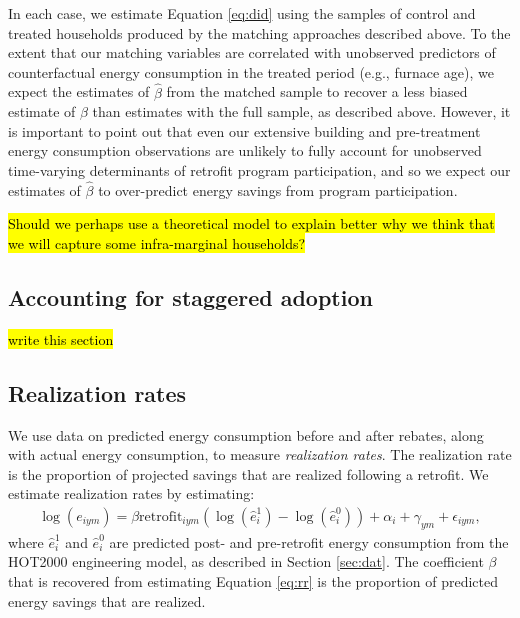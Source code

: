 \documentclass{article}
\newcommand{\hlc}[2][yellow]{ {\sethlcolor{#1} \hl{#2}} }
\begin{document}
In each case, we estimate Equation \eqref{eq:did} using the samples of control and treated households produced by the matching approaches described above. To the extent that our matching variables are correlated with unobserved predictors of counterfactual energy consumption in the treated period (e.g., furnace age), we expect the estimates of $\hat{\beta}$ from the matched sample to recover a less biased estimate of $\beta$ than estimates with the full sample, as described above. However, it is important to point out that even our extensive building and pre-treatment energy consumption observations are unlikely to fully account for unobserved time-varying determinants of retrofit program participation, and so we expect our estimates of $\hat{\beta}$ to over-predict energy savings from program participation.

\hlc{Should we perhaps use a theoretical model to explain better why we think that we will capture some infra-marginal households?}

\subsection{Accounting for staggered adoption}
 
\hlc{write this section}
 
\subsection{Realization rates}\label{sec:rr_method}
We use data on predicted energy consumption before and after rebates, along with actual energy consumption, to measure \textit{realization rates}. The realization rate is the proportion of projected savings that are realized following a retrofit. We estimate realization rates by estimating:
\begin{align}
	\log(e_{iym}) = \beta \text{retrofit}_{iym} \left(\log(\hat{e}^1_i) - \log(\hat{e}^0_i) \right) + \alpha_i + \gamma_{ym} + \epsilon_{iym},
	\label{eq:rr}
\end{align} 
where $\hat{e}^1_i$ and $\hat{e}^0_i$ are predicted post- and pre-retrofit energy consumption from the HOT2000 engineering model, as described in Section \ref{sec:dat}. The coefficient $\beta$ that is recovered from estimating Equation \eqref{eq:rr} is the proportion of predicted energy savings that are realized.
\end{document}
